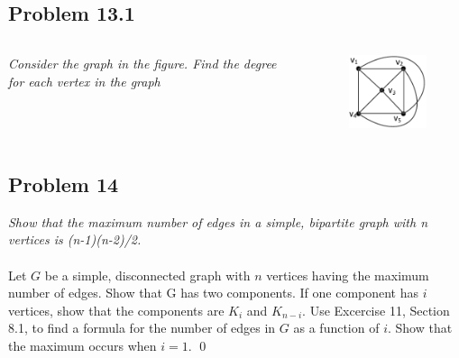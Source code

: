 \documentclass[
        ]{beamer}
\begin{document}
    \subsection{Problem 13.1}
        \begin{frame}[c]{\subsecname}
            \begin{columns}
                \emph{Consider the graph in the figure. Find the degree for each vertex in the graph}\\$\;$\\
            \column{34mm}
                \begin{figure}
                    \centering
                    \includegraphics[width=34mm]{tut11p13_1}
                \end{figure}
            \end{columns}
        \end{frame}



    \subsection{Problem 14}
        \begin{frame}[c]{\subsecname}
            \emph{Show that the maximum number of edges in a simple, bipartite graph with n
vertices is (n-1)(n-2)/2.}\\$\;$\\\pause
            Let $G$ be a simple, disconnected graph with $n$ vertices having the maximum number of edges. Show that G has two components. If one component has $i$ vertices, show that the components are $K_i$ and $K_{n-i}$. Use Excercise 11, Section 8.1, to find a formula for the number of edges in $G$ as a function of $i$. Show that the maximum occurs when $i=1$. \qed
        \end{frame}
\end{document}
